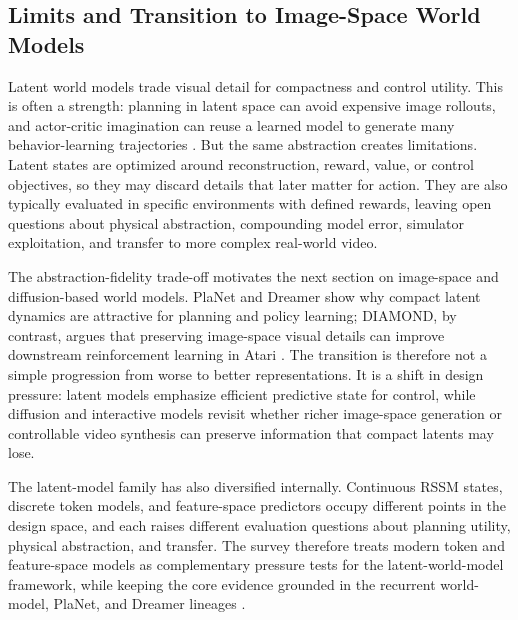 \subsection{Limits and Transition to Image-Space World Models}

Latent world models trade visual detail for compactness and control utility. This is often a strength: planning in latent space can avoid expensive image rollouts, and actor-critic imagination can reuse a learned model to generate many behavior-learning trajectories \cite{hafner2019_planet_prov,hafner2020_dreamer_prov}. But the same abstraction creates limitations. Latent states are optimized around reconstruction, reward, value, or control objectives, so they may discard details that later matter for action. They are also typically evaluated in specific environments with defined rewards, leaving open questions about physical abstraction, compounding model error, simulator exploitation, and transfer to more complex real-world video.

The abstraction-fidelity trade-off motivates the next section on image-space and diffusion-based world models. PlaNet and Dreamer show why compact latent dynamics are attractive for planning and policy learning; DIAMOND, by contrast, argues that preserving image-space visual details can improve downstream reinforcement learning in Atari \cite{hafner2019_planet_prov,hafner2020_dreamer_prov,alonso2024_diamond_prov}. The transition is therefore not a simple progression from worse to better representations. It is a shift in design pressure: latent models emphasize efficient predictive state for control, while diffusion and interactive models revisit whether richer image-space generation or controllable video synthesis can preserve information that compact latents may lose.

The latent-model family has also diversified internally. Continuous RSSM states, discrete token models, and feature-space predictors occupy different points in the design space, and each raises different evaluation questions about planning utility, physical abstraction, and transfer. The survey therefore treats modern token and feature-space models as complementary pressure tests for the latent-world-model framework, while keeping the core evidence grounded in the recurrent world-model, PlaNet, and Dreamer lineages \cite{ha2018_world_models_prov,hafner2019_planet_prov,hafner2020_dreamer_prov,wu2024ivideogpt,assran2025vjepa2_prov}.
